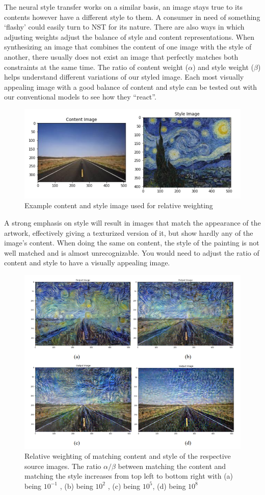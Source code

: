 \documentclass[preprint,12pt]{elsarticle}
\begin{document}
The neural style transfer works on a similar basis, an image stays true to its contents however have a different style to them. A consumer in need of something ‘flashy’ could easily turn to NST for its nature. There are also ways in which adjusting weights adjust the balance of style and content representations. When synthesizing an image that combines the content of one image with the style of another, there usually does not exist an image that perfectly matches both constraints at the same time. The ratio of content weight ($\alpha$) and style weight ($\beta$) helps understand different variations of our styled image. Each most visually appealing image with a good balance of content and style can be tested out with our conventional models to see how they “react”.

\begin{figure}[ht]
\centering\includegraphics[width=0.7\linewidth]{content_style.png}
\caption{Example content and style image used for relative weighting}
\label{fig:content_style}
\end{figure}

A strong emphasis on style will result in images that match the appearance of the artwork, effectively giving a texturized version of it, but show hardly any of the image’s content. When doing the same on content, the style of the painting is not well matched and is almost unrecognizable. You would need to adjust the ratio of content and style to have a visually appealing image.

\begin{figure}[!h]
\centering\includegraphics[width=0.5\linewidth]{relative_weight.png}
\caption{Relative weighting of matching content and style of the respective source images. The ratio $\alpha/\beta$ between matching the content and matching the style increases from top left to bottom right with (a) being $10^{-1}$ , (b) being $10^{2}$ , (c) being $10^{5}$, (d) being $10^{8}$}
\label{fig:relative}
\end{figure}
\end{document}

